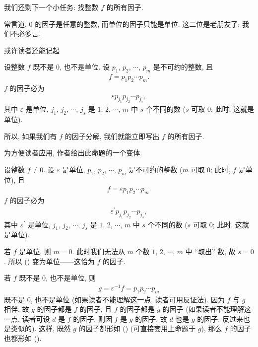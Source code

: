 \myLine

我们还剩下一个小任务: 找整数 $f$ 的所有因子.

常言道, $0$ 的因子是任意的整数, 而单位的因子只能是单位. 这二位是老朋友了; 我们不必多言.

或许读者还能记起
\begin{proposition}
    设整数 $f$ 既不是 $0$, 也不是单位. 设 $p_1$, $p_2$, $\cdots$, $p_m$ 是不可约的整数, 且
    \begin{align*}
        f = p_1 p_2 \cdots p_m.
    \end{align*}
    $f$ 的因子必为
    \begin{align*}
        \varepsilon p_{j_1} p_{j_2} \cdots p_{j_s},
    \end{align*}
    其中 $\varepsilon$ 是单位, $j_1$, $j_2$, $\cdots$, $j_s$ 是 $1$, $2$, $\cdots$, $m$ 中 $s$ 个不同的数 ($s$ 可取 $0$; 此时, 这就是单位).
\end{proposition}

所以, 如果我们有 $f$ 的因子分解, 我们就能立即写出 $f$ 的所有因子.

为方便读者应用, 作者给出此命题的一个变体.

\begin{proposition}
    设整数 $f \neq 0$. 设 $\varepsilon$ 是单位, $p_1$, $p_2$, $\cdots$, $p_m$ 是不可约的整数 ($m$ 可取 $0$; 此时, $f$ 是单位), 且
    \begin{align*}
        f = \varepsilon p_1 p_2 \cdots p_m.
    \end{align*}
    $f$ 的因子必为
    \begin{align*}
        \varepsilon^{\prime} p_{j_1} p_{j_2} \cdots p_{j_s} \tag*{(\myStar)},
    \end{align*}
    其中 $\varepsilon^{\prime}$ 是单位, $j_1$, $j_2$, $\cdots$, $j_s$ 是 $1$, $2$, $\cdots$, $m$ 中 $s$ 个不同的数 ($s$ 可取 $0$; 此时, 这就是单位).
\end{proposition}

\begin{pf}
    若 $f$ 是单位, 则 $m = 0$. 此时我们无法从 $m$ 个数 $1$, $2$, $\cdots$, $m$ 中 ``取出'' 数, 故 $s = 0$. 所以 (\myStar) 变为单位——这恰为 $f$ 的因子.

    若 $f$ 既不是 $0$, 也不是单位, 则
    \begin{align*}
        g = \varepsilon^{-1} f = p_1 p_2 \cdots p_m
    \end{align*}
    既不是 $0$, 也不是单位 (如果读者不能理解这一点, 读者可用反证法). 因为 $f$ 与 $g$ 相伴, 故 $g$ 的因子都是 $f$ 的因子, 且 $f$ 的因子都是 $g$ 的因子 (如果读者不能理解这一点, 读者可设 $d$ 是 $f$ 的因子, 则因 $f$ 是 $g$ 的因子, 故 $d$ 也是 $g$ 的因子; 反过来也是类似的). 这样, 既然 $g$ 的因子都形如 (\myStar) (可直接套用上命题于 $g$), 那么 $f$ 的因子也都形如 (\myStar).
\end{pf}

